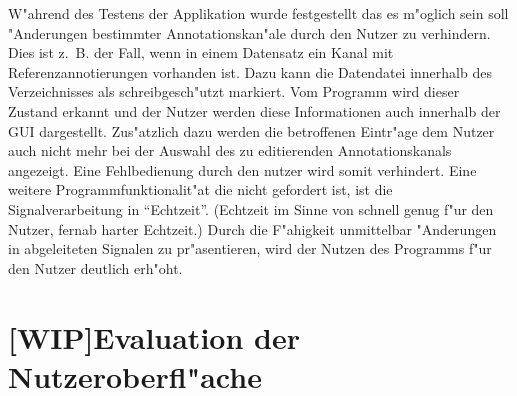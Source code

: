 W"ahrend des Testens der Applikation wurde festgestellt das es m"oglich sein soll "Anderungen bestimmter Annotationskan"ale durch den Nutzer zu verhindern.
Dies ist z.~B. der Fall, wenn in einem Datensatz ein Kanal mit Referenzannotierungen vorhanden ist.
Dazu kann die Datendatei innerhalb des Verzeichnisses als schreibgesch"utzt markiert.
Vom Programm wird dieser Zustand erkannt und der Nutzer werden diese Informationen auch innerhalb der \ac{GUI} dargestellt.
Zus"atzlich dazu werden die betroffenen Eintr"age dem Nutzer auch nicht mehr bei der Auswahl des zu editierenden Annotationskanals angezeigt.
Eine Fehlbedienung durch den nutzer wird somit verhindert.
Eine weitere Programmfunktionalit"at die nicht gefordert ist, ist die Signalverarbeitung in "`Echtzeit"'.
(Echtzeit im Sinne von schnell genug f"ur den Nutzer, fernab harter Echtzeit.)
Durch die F"ahigkeit unmittelbar "Anderungen in abgeleiteten Signalen zu pr"asentieren, wird der Nutzen des Programms f"ur den Nutzer deutlich erh"oht.


\section{[WIP]Evaluation der Nutzeroberfl"ache}






